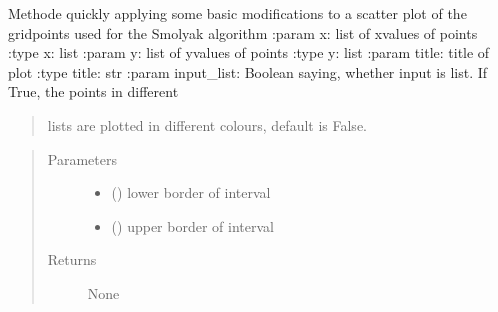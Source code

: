 \documentclass[letterpaper,10pt,english]{sphinxmanual}
\begin{document}

\begin{fulllineitems}
\label{\detokenize{index:Studienprojekt_Smolyak_qmc_one_point.modified_scatter_plot}}
Methode quickly applying some basic modifications to a scatter plot of the gridpoints
used for the Smolyak algorithm
:param x: list of x\sphinxhyphen{}values of points
:type x: list
:param y: list of y\sphinxhyphen{}values of points
:type y: list
:param title: title of plot
:type title: str
:param input\_list: Boolean saying, whether input is list. If True, the points in different
\begin{quote}

lists are plotted in different colours, default is False.
\end{quote}
\begin{quote}\begin{description}
\item[{Parameters}] \leavevmode\begin{itemize}
\item {} 
 (\sphinxstyleliteralemphasis{\sphinxupquote{, }}) \textendash{} lower border of interval

\item {} 
 (\sphinxstyleliteralemphasis{\sphinxupquote{, }}) \textendash{} upper border of interval

\end{itemize}

\item[{Returns}] \leavevmode
None

\end{description}\end{quote}

\end{fulllineitems}
\end{document}
